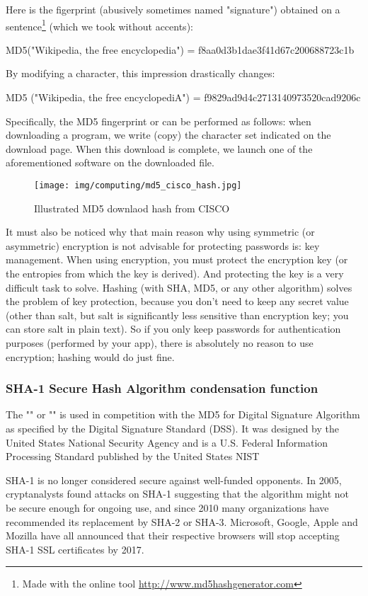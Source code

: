 	Here is the figerprint (abusively sometimes named "signature") obtained on a sentence\footnote{Made with the online tool \url{http://www.md5hashgenerator.com}} (which we took without accents):
	\begin{center}
	MD5("Wikipedia, the free encyclopedia") = f8aa0d3b1dae3f41d67c200688723c1b
	\end{center}
	By modifying a character, this impression drastically changes:
	\begin{center}
	MD5 ("Wikipedia, the free encyclopediA") = f9829ad9d4c2713140973520cad9206c
	\end{center}
	Specifically, the MD5 fingerprint or can be performed as follows: when downloading a program, we write (copy) the character set indicated on the download page. When this download is complete, we launch one of the aforementioned software on the downloaded file.
	\begin{figure}[H]
		\centering
		\texttt{[image: img/computing/md5\_cisco\_hash.jpg]}
		\caption{Illustrated MD5 downlaod hash from CISCO}
	\end{figure}
	It must also be noticed why that main reason why using symmetric (or asymmetric) encryption is not advisable for protecting passwords is: key management. When using encryption, you must protect the encryption key (or the entropies from which the key is derived). And protecting the key is a very difficult task to solve. Hashing (with SHA, MD5, or any other algorithm) solves the problem of key protection, because you don't need to keep any secret value (other than salt, but salt is significantly less sensitive than encryption key; you can store salt in plain text). So if you only keep passwords for authentication purposes (performed by your app), there is absolutely no reason to use encryption; hashing would do just fine. 
	
	\pagebreak
	\subsubsection{SHA-1 Secure Hash Algorithm condensation function}
	The "" or "" is used in competition with the MD5 for Digital Signature Algorithm as specified by the Digital Signature Standard (DSS). It was designed by the United States National Security Agency and is a U.S. Federal Information Processing Standard published by the United States NIST

	SHA-1 is no longer considered secure against well-funded opponents. In 2005, cryptanalysts found attacks on SHA-1 suggesting that the algorithm might not be secure enough for ongoing use, and since 2010 many organizations have recommended its replacement by SHA-2 or SHA-3. Microsoft, Google, Apple and Mozilla have all announced that their respective browsers will stop accepting SHA-1 SSL certificates by 2017.


